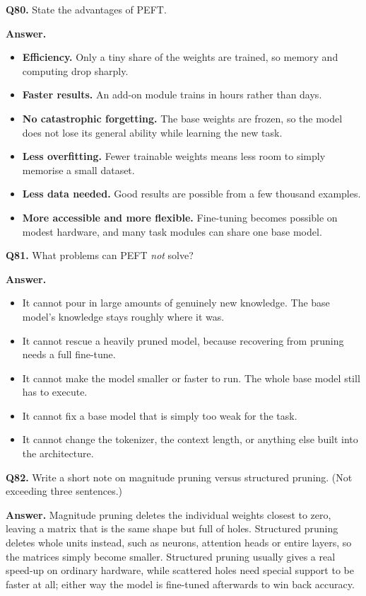 \documentclass[11pt]{article}
\begin{document}
\medskip
\textbf{Q80.} State the advantages of PEFT.

\textbf{Answer.}
\begin{itemize}
  \item \textbf{Efficiency.} Only a tiny share of the weights are trained, so memory and computing drop sharply.
  \item \textbf{Faster results.} An add-on module trains in hours rather than days.
  \item \textbf{No catastrophic forgetting.} The base weights are frozen, so the model does not lose its general ability while learning the new task.
  \item \textbf{Less overfitting.} Fewer trainable weights means less room to simply memorise a small dataset.
  \item \textbf{Less data needed.} Good results are possible from a few thousand examples.
  \item \textbf{More accessible and more flexible.} Fine-tuning becomes possible on modest hardware, and many task modules can share one base model.
\end{itemize}

\medskip
\textbf{Q81.} What problems can PEFT \emph{not} solve?

\textbf{Answer.}
\begin{itemize}
  \item It cannot pour in large amounts of genuinely new knowledge. The base model's knowledge stays roughly where it was.
  \item It cannot rescue a heavily pruned model, because recovering from pruning needs a full fine-tune.
  \item It cannot make the model smaller or faster to run. The whole base model still has to execute.
  \item It cannot fix a base model that is simply too weak for the task.
  \item It cannot change the tokenizer, the context length, or anything else built into the architecture.
\end{itemize}

\medskip
\textbf{Q82.} Write a short note on magnitude pruning versus structured pruning. (Not exceeding
three sentences.)

\textbf{Answer.} Magnitude pruning deletes the individual weights closest to zero, leaving a
matrix that is the same shape but full of holes. Structured pruning deletes whole units
instead, such as neurons, attention heads or entire layers, so the matrices simply become
smaller. Structured pruning usually gives a real speed-up on ordinary hardware, while scattered
holes need special support to be faster at all; either way the model is fine-tuned afterwards
to win back accuracy.
\end{document}
